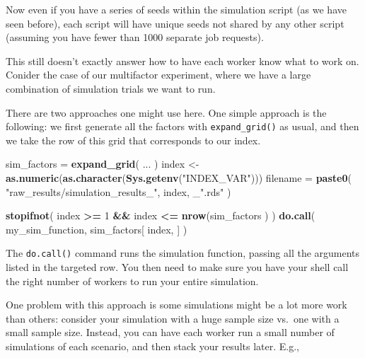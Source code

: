 \documentclass[
]{book}
\newenvironment{Shaded}{\begin{snugshade}}{\end{snugshade}}
\newcommand{\DecValTok}[1]{\textcolor[rgb]{0.00,0.00,0.81}{#1}}
\newcommand{\FunctionTok}[1]{\textcolor[rgb]{0.13,0.29,0.53}{\textbf{#1}}}
\newcommand{\NormalTok}[1]{#1}
\newcommand{\OtherTok}[1]{\textcolor[rgb]{0.56,0.35,0.01}{#1}}
\newcommand{\SpecialCharTok}[1]{\textcolor[rgb]{0.81,0.36,0.00}{\textbf{#1}}}
\newcommand{\StringTok}[1]{\textcolor[rgb]{0.31,0.60,0.02}{#1}}
\begin{document}
Now even if you have a series of seeds within the simulation script (as we have seen before), each script will have unique seeds not shared by any other script (assuming you have fewer than 1000 separate job requests).

This still doesn't exactly answer how to have each worker know what to work on.
Conider the case of our multifactor experiment, where we have a large combination of simulation trials we want to run.

There are two approaches one might use here.
One simple approach is the following: we first generate all the factors with \texttt{expand\_grid()} as usual, and then we take the row of this grid that corresponds to our index.

\begin{Shaded}
\begin{Highlighting}[]
\NormalTok{sim\_factors }\OtherTok{=} \FunctionTok{expand\_grid}\NormalTok{( ... )}
\NormalTok{index }\OtherTok{\textless{}{-}} \FunctionTok{as.numeric}\NormalTok{(}\FunctionTok{as.character}\NormalTok{(}\FunctionTok{Sys.getenv}\NormalTok{(}\StringTok{"INDEX\_VAR"}\NormalTok{)))}
\NormalTok{filename }\OtherTok{=} \FunctionTok{paste0}\NormalTok{( }\StringTok{"raw\_results/simulation\_results\_"}\NormalTok{, index, \_}\StringTok{".rds"}\NormalTok{ )}

\FunctionTok{stopifnot}\NormalTok{( index }\SpecialCharTok{\textgreater{}=} \DecValTok{1} \SpecialCharTok{\&\&}\NormalTok{ index }\SpecialCharTok{\textless{}=} \FunctionTok{nrow}\NormalTok{(sim\_factors ) )}
\FunctionTok{do.call}\NormalTok{( my\_sim\_function, sim\_factors[ index, ] )}
\end{Highlighting}
\end{Shaded}

The \texttt{do.call()} command runs the simulation function, passing all the arguments listed in the targeted row.
You then need to make sure you have your shell call the right number of workers to run your entire simulation.

One problem with this approach is some simulations might be a lot more work than others: consider your simulation with a huge sample size vs.~one with a small sample size.
Instead, you can have each worker run a small number of simulations of each scenario, and then stack your results later.
E.g.,

\begin{Shaded}
\end{Shaded}
\end{document}
